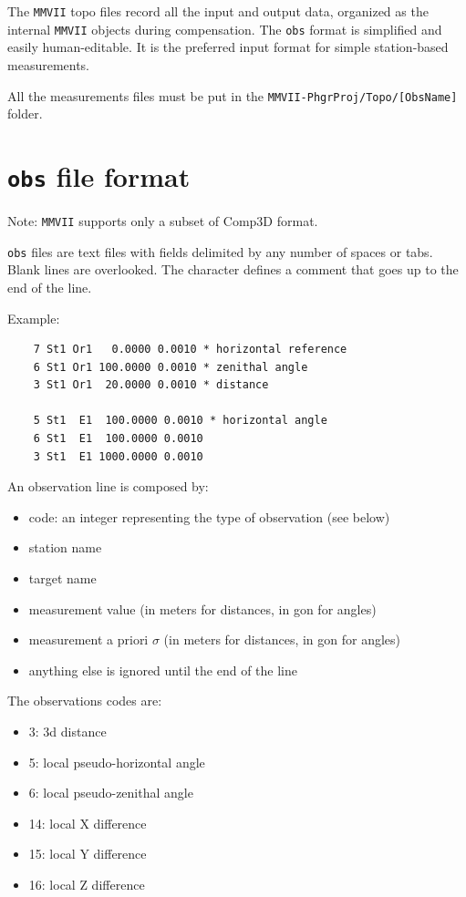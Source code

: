 The {\tt MMVII} topo files record all the input and output data, organized as the internal {\tt MMVII} objects during compensation.
The {\tt obs} format is simplified and easily human-editable. It is the preferred input format for simple station-based measurements.

All the measurements files must be put in the {\tt MMVII-PhgrProj/Topo/[ObsName]} folder.

\section{{\tt obs} file format}
\label{sec:compObsFormat}
Note: {\tt MMVII} supports only a subset of Comp3D format.

{\tt obs} files are text files with fields delimited by any number of spaces or tabs. Blank lines are overlooked.
The {\tt *} character defines a comment that goes up to the end of the line.

Example:

\begin{verbatim}
    7 St1 Or1   0.0000 0.0010 * horizontal reference
    6 St1 Or1 100.0000 0.0010 * zenithal angle
    3 St1 Or1  20.0000 0.0010 * distance

    5 St1  E1  100.0000 0.0010 * horizontal angle
    6 St1  E1  100.0000 0.0010
    3 St1  E1 1000.0000 0.0010
\end{verbatim}

An observation line is composed by:

\begin{itemize}
    \item code: an integer representing the type of observation (see below)
    \item station name
    \item target name
    \item measurement value (in meters for distances, in gon for angles)
    \item measurement a priori $\sigma$ (in meters for distances, in gon for angles)
    \item anything else is ignored until the end of the line
\end{itemize}

The observations codes are:

\begin{itemize}
    \item 3: 3d distance
    \item 5: local pseudo-horizontal angle
    \item 6: local pseudo-zenithal angle
    \item 14: local X difference
    \item 15: local Y difference
    \item 16: local Z difference
\end{itemize}

